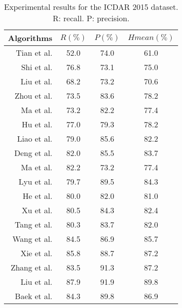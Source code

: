 \begin{table}[!t]
    \caption{Experimental results for the ICDAR 2015 dataset. R: recall. P: precision. }
    \label{tab:ic15}
    \centering
    \newcommand{\tabincell}[2]{\begin{tabular}{@{}#1@{}}#2\end{tabular}}
    \small
\begin{tabular}{ r  |ccc}
      \hline
      Algorithms  & $R (\%)$  & $P (\%)$ & $Hmean (\%)$ \\
      \hline
      \hline
      Tian et al. \cite{tian2016detecting} & 52.0 & 74.0 & 61.0 \\
      \hline
      Shi et al. \cite{shi2017detecting} & 76.8  & 73.1 & 75.0\\
      \hline
      Liu et al. \cite{liu2017deep} & 68.2 & 73.2 & 70.6\\
      \hline
      Zhou et al. \cite{zhou2017east}  & 73.5 & 83.6 & 78.2\\
      \hline
      Ma et al. \cite{ma2018arbitrary}  & 73.2 & 82.2 & 77.4\\
      \hline
      Hu et al. \cite{hu2017wordsup} & 77.0 & 79.3 & 78.2\\
      \hline
      Liao et al. \cite{liao2018rotation} & 79.0 & 85.6 & 82.2\\
      \hline
      Deng et al. \cite{deng2018pixellink} & 82.0 & 85.5 & 83.7\\
      \hline
      Ma et al. \cite{ma2018arbitrary} & 82.2 & 73.2 & 77.4\\
      \hline
      Lyu et al. \cite{lyu2018multi} & 79.7 & 89.5 & 84.3\\
      \hline
      He et al. \cite{he2017deep} & 80.0 & 82.0 & 81.0 \\
      \hline
      Xu et al. \cite{xu2019textfield} & 80.5 & 84.3 & 82.4  \\
      \hline
      Tang et al. \cite{tang2019detecting} & 80.3 & 83.7 & 82.0  \\
      \hline
      Wang et al. \cite{wang2019shape} & 84.5 & 86.9 & 85.7 \\
      \hline
      Xie et al. \cite{xie2018scene} & 85.8 & 88.7 & 87.2 \\
      \hline
      Zhang et al. \cite{zhang2019look} & 83.5 & 91.3 & 87.2  \\
      \hline
      Liu et al. \cite{liu2018fots} & 87.9 & 91.9 & 89.8 \\
      \hline
      Baek et al. \cite{baek2019character} & 84.3 & 89.8 & 86.9 \\

\end{tabular}
\end{table}
